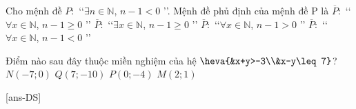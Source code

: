 \begin{ex}%
	Cho mệnh đề $P \colon$ \lq \lq $\exists n \in \mathbb{N}$, $n-1<0$ \rq \rq. Mệnh đề phủ định của mệnh đề P là
	\choice
	{\True $\overline{P} \colon$ \lq \lq $\forall x \in \mathbb{N}$, $n-1 \geq 0$ \rq \rq}
	{$\overline{P} \colon$ \lq \lq $\exists x \in \mathbb{N}$, $n-1 \geq 0$ \rq \rq}
	{$\overline{P}  \colon$ \lq \lq $\forall x \in \mathbb{N}$, $n-1 > 0$ \rq \rq}
	{$\overline{P} \colon$ \lq \lq $\forall x \in \mathbb{N}$, $n-1 < 0$ \rq \rq}
\end{ex}
\begin{ex}%
	Điểm nào sau đây thuộc miền nghiệm của hệ $\heva{&x+y>-3\\&x-y\leq 7}$?
	\choice
	{$N(-7;0)$}
	{$Q(7;-10)$}
	{$P(0;-4)$}
	{$M(2;1)$}
\end{ex}



\TNTF



[ans-DS]

